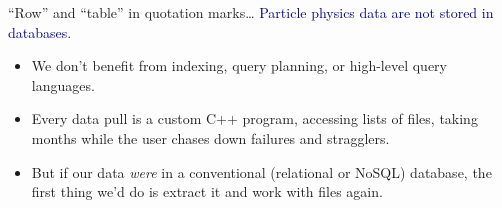 \documentclass[aspectratio=169]{beamer}
\begin{document}
\begin{frame}{``Row'' and ``table'' in quotation marks\ldots}
\vspace{0.75 cm}
\textcolor{darkblue}{\LARGE Particle physics data are not stored in databases.}

\vspace{0.5 cm}
\begin{itemize}\setlength{\itemsep}{0.5 cm}
\item<2-> We don't benefit from indexing, query planning, or high-level query languages.
\item<3-> Every data pull is a custom C++ program, accessing lists of files, taking months while the user chases down failures and stragglers.
\item<4-> But if our data {\it were} in a conventional (relational or NoSQL) database, the first thing we'd do is extract it and work with files again.
\end{itemize}
\begin{center}
\huge {}
\end{center}
\end{frame}
\end{document}
